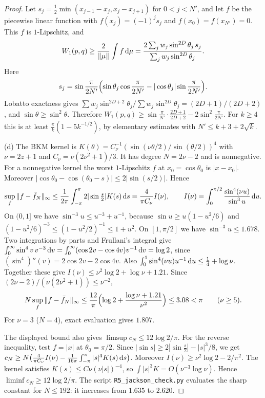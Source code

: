 \documentclass[11pt]{amsart}
\theoremstyle{definition}
\theoremstyle{remark}
\begin{document}
\begin{proof}
Let $s_j=\frac12\min(x_{j-1}-x_j,x_j-x_{j+1})$ for $0<j<N'$, and let $f$ be
the piecewise linear function with $f(x_j)=(-1)^js_j$ and
$f(x_0)=f(x_{N'})=0$.  This $f$ is $1$-Lipschitz, and
\[
 W_1(p,q)\ge\frac{2}{\|\mu\|}\int f\,\mathrm{d}\mu=\frac{2\sum_jw_j\sin^{2D}\theta_j\,s_j}{\sum_jw_j\sin^{2D}\theta_j}.
\]
Here
\[
 s_j=\sin\frac\pi{2N'}\Bigl(\sin\theta_j\cos\frac\pi{2N'}-|\cos\theta_j|\sin\frac\pi{2N'}\Bigr).
\]
Lobatto exactness gives
$\sum w_j\sin^{2D+2}\theta_j/\sum w_j\sin^{2D}\theta_j=(2D+1)/(2D+2)$, and
$\sin\theta\ge\sin^2\theta$.  Therefore
$W_1(p,q)\ge\sin\frac\pi{N'}\cdot\frac{2D+1}{2D+2}-2\sin^2\frac\pi{2N'}$.
For $k\ge4$ this is at least $\frac\pi k(1-5k^{-1/2})$, by elementary
estimates with $N'\le k+3+2\sqrt k$.

(d) The BKM kernel is $K(\theta)=C_\nu^{-1}(\sin(\nu\theta/2)/\sin(\theta/2))^4$
with $\nu=2z+1$ and $C_\nu=\nu(2\nu^2+1)/3$.  It has degree $N=2\nu-2$ and is
nonnegative.  For a nonnegative kernel the worst $1$-Lipschitz $f$ at
$x_0=\cos\theta_0$ is $|x-x_0|$.  Moreover
$|\cos\theta_0-\cos(\theta_0-s)|\le2|\sin(s/2)|$.  Hence
\[
 \sup_f\|f-\bar f_N\|_\infty\le\frac1{2\pi}\int_{-\pi}^\pi2|\sin\tfrac s2|K(s)\,\mathrm{d} s
 =\frac{4}{\pi C_\nu}I(\nu),\qquad I(\nu)=\int_0^{\pi/2}\frac{\sin^4(\nu u)}{\sin^3u}\,\mathrm{d} u .
\]
On $(0,1]$ we have $\sin^{-3}u\le u^{-3}+u^{-1}$, because
$\sin u\ge u(1-u^2/6)$ and $(1-u^2/6)^{-3}\le(1-u^2/2)^{-1}\le1+u^2$.  On
$[1,\pi/2]$ we have $\sin^{-3}u\le1.678$.  Two integrations by parts and
Frullani's integral give
$\int_0^\infty\sin^4v\,v^{-3}\,\mathrm{d} v=\int_0^\infty(\cos2v-\cos4v)v^{-1}\,\mathrm{d} v=\log2$,
since $(\sin^4)''(v)=2\cos2v-2\cos4v$.  Also
$\int_0^1\sin^4(\nu u)u^{-1}\,\mathrm{d} u\le\frac14+\log\nu$.  Together these give
$I(\nu)\le\nu^2\log2+\log\nu+1.21$.  Since
$(2\nu-2)/(\nu(2\nu^2+1))\le\nu^{-2}$,
\[
 N\sup_f\|f-\bar f_N\|_\infty\le\frac{12}{\pi}\Bigl(\log2+\frac{\log\nu+1.21}{\nu^2}\Bigr)
 \le3.08<\pi\qquad(\nu\ge5).
\]
For $\nu=3$ ($N=4$), exact evaluation gives $1.807$.

The displayed bound also gives $\limsup c_N\le12\log2/\pi$.  For the
reverse inequality, test $f=|x|$ at $\theta_0=\pi/2$.  Since
$|\sin s|\ge2|\sin\frac s2|-|s|^3/8$, we get
$c_N\ge N\bigl(\frac4{\pi C_\nu}I(\nu)-\frac1{16\pi}\int_{-\pi}^{\pi}|s|^3K(s)\,\mathrm{d} s\bigr)$.
Moreover $I(\nu)\ge\nu^2\log2-2/\pi^2$.  The kernel satisfies
$K(s)\le C\nu(\nu|s|)^{-4}$, so $\int|s|^3K=O(\nu^{-3}\log\nu)$.  Hence
$\liminf c_N\ge12\log2/\pi$.
The script \texttt{R5\_\allowbreak{}jackson\_\allowbreak{}check.py} evaluates the sharp constant for
$N\le192$: it increases from $1.635$ to $2.620$.
\end{proof}
\end{document}
